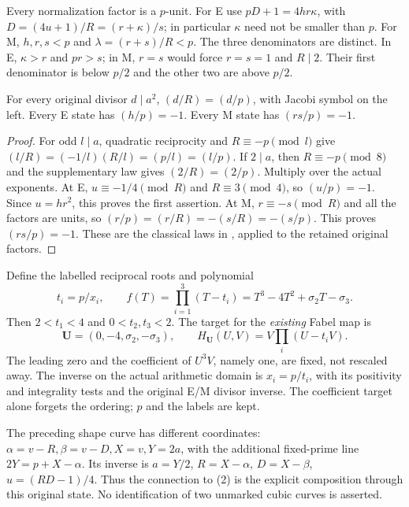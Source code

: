 Every normalization factor is a $p$-unit. For E use
$pD+1=4hr\kappa$, with $D=(4u+1)/R=(r+\kappa)/s$; in particular $\kappa$
need not be smaller than $p$. For M, $h,r,s<p$ and
$\lambda=(r+s)/R<p$. The three denominators are distinct. In E,
$\kappa>r$ and $pr>s$; in M, $r=s$ would force $r=s=1$ and $R\mid2$.
Their first denominator is below $p/2$ and the other two are above $p/2$.

\begin{lemma}\label{lem:character}
For every original divisor $d\mid a^2$, $(d/R)=(d/p)$, with Jacobi symbol on
the left. Every E state has $(h/p)=-1$. Every M state has $(rs/p)=-1$.
\end{lemma}
\begin{proof}
For odd $l\mid a$, quadratic reciprocity and $R\equiv-p\pmod l$ give
$(l/R)=(-1/l)(R/l)=(p/l)=(l/p)$. If $2\mid a$, then $R\equiv-p\pmod8$
and the supplementary law gives $(2/R)=(2/p)$. Multiply over the actual
exponents. At E, $u\equiv-1/4\pmod R$ and $R\equiv3\pmod4$, so
$(u/p)=-1$. Since $u=hr^2$, this proves the first assertion.
At M, $r\equiv-s\pmod R$ and all the factors are units, so
$(r/p)=(r/R)=-(s/R)=-(s/p)$. This proves $(rs/p)=-1$.
These are the classical laws in \cite[\S6.4]{Hatcher}, applied to the retained
original factors.
\end{proof}

Define the labelled reciprocal roots and polynomial
\[
 t_i=p/x_i,\qquad f(T)=\prod_{i=1}^3(T-t_i)
       =T^3-4T^2+\sigma_2T-\sigma_3.                 \tag{1}
\]
Then $2<t_1<4$ and $0<t_2,t_3<2$. The target for the \emph{existing} Fabel
map is
\[
 \mathbf U=(0,-4,\sigma_2,-\sigma_3),\qquad
 H_{\mathbf U}(U,V)=V\prod_i(U-t_iV).               \tag{2}
\]
The leading zero and the coefficient of $U^3V$, namely one, are fixed, not
rescaled away. The inverse on the actual arithmetic domain is $x_i=p/t_i$,
with its positivity and integrality tests and the original E/M divisor inverse.
The coefficient target alone forgets the ordering; $p$ and the labels are kept.

The preceding shape curve has different coordinates:
$\alpha=v-R,\beta=v-D,X=v,Y=2a$, with the additional fixed-prime line
$2Y=p+X-\alpha$. Its inverse is $a=Y/2$, $R=X-\alpha$,
$D=X-\beta$, $u=(RD-1)/4$. Thus the connection to (2) is the explicit
composition through this original state. No identification of two unmarked
cubic curves is asserted.

